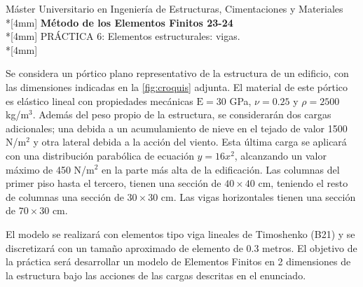 \documentclass[a4paper,12pt]{article}
\begin{document}
\def\bm#1{{\mbox{\boldmath $#1$}}}
\def\eqdef{\buildrel \rm def \over =}
\def\signo{\mathop{\rm signo}\nolimits}

\mbox{}\vspace*{-20mm}


{\centering
{\small\sc %
Máster Universitario en Ingeniería de Estructuras, Cimentaciones y Materiales}\\*[4mm]
{\Large\bf Método de los Elementos Finitos 23-24}\\*[4mm]
PRÁCTICA 6: Elementos estructurales: vigas. \\*[4mm]}


\noindent
Se considera un pórtico plano representativo de la estructura de un edificio, con las dimensiones indicadas en la \cref{fig:croquis} adjunta. El material de este pórtico es elástico lineal con propiedades mecánicas $\text{E}=30$ GPa, $\nu=0.25$ y $\rho=2500$ kg/m$^3$. Además del peso propio de la estructura, se considerarán dos cargas adicionales; una debida a un acumulamiento de nieve en el tejado de valor 1500 N/m$^2$ y otra lateral debida a la acción del viento. Esta última carga se aplicará con una distribución parabólica de ecuación $y=16x^2$, alcanzando un valor máximo de 450 N/m$^2$ en la parte más alta de la edificación.
Las columnas del primer piso hasta el tercero, tienen una sección de $40 \times 40$ cm, teniendo el resto de columnas una sección de $30 \times 30$ cm. Las vigas horizontales tienen una sección de $70 \times 30$ cm.

El modelo se realizará con elementos tipo viga lineales de Timoshenko (B21) y se discretizará con un tamaño aproximado de elemento de 0.3 metros. El objetivo de la práctica será desarrollar un modelo de Elementos Finitos en 2 dimensiones de la estructura bajo las acciones de las cargas descritas en el enunciado.


\vspace{10mm}
\end{document}
